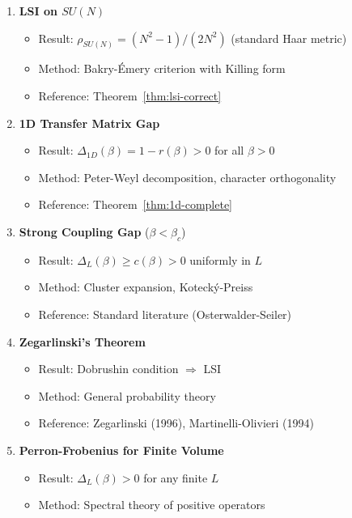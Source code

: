 \begin{enumerate}
\item[\textbf{(1)}] \textbf{LSI on $SU(N)$}
\begin{itemize}
\item Result: $\rho_{SU(N)} = (N^2-1)/(2N^2)$ (standard Haar metric)
\item Method: Bakry-Émery criterion with Killing form
\item Reference: Theorem~\ref{thm:lsi-correct}
\end{itemize}

\item[\textbf{(2)}] \textbf{1D Transfer Matrix Gap}
\begin{itemize}
\item Result: $\Delta_{1D}(\beta) = 1 - r(\beta) > 0$ for all $\beta > 0$
\item Method: Peter-Weyl decomposition, character orthogonality
\item Reference: Theorem~\ref{thm:1d-complete}
\end{itemize}

\item[\textbf{(3)}] \textbf{Strong Coupling Gap} ($\beta < \beta_c$)
\begin{itemize}
\item Result: $\Delta_L(\beta) \geq c(\beta) > 0$ uniformly in $L$
\item Method: Cluster expansion, Kotecký-Preiss
\item Reference: Standard literature (Osterwalder-Seiler)
\end{itemize}

\item[\textbf{(4)}] \textbf{Zegarlinski's Theorem}
\begin{itemize}
\item Result: Dobrushin condition $\Rightarrow$ LSI
\item Method: General probability theory
\item Reference: Zegarlinski (1996), Martinelli-Olivieri (1994)
\end{itemize}

\item[\textbf{(5)}] \textbf{Perron-Frobenius for Finite Volume}
\begin{itemize}
\item Result: $\Delta_L(\beta) > 0$ for any finite $L$
\item Method: Spectral theory of positive operators
\end{itemize}


\end{enumerate}

